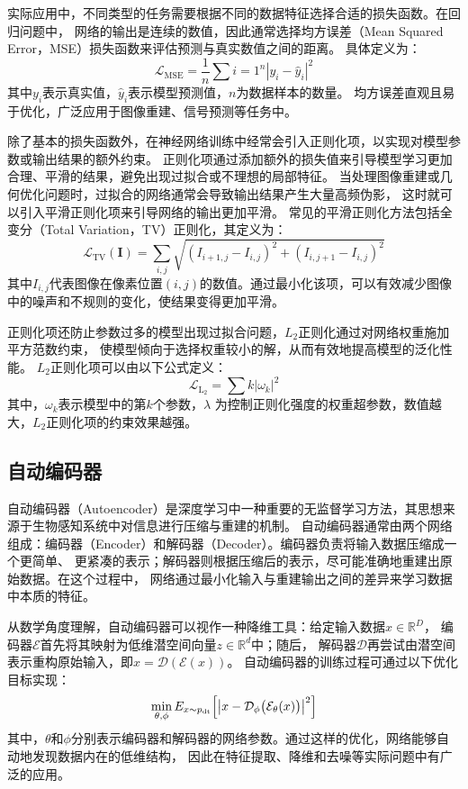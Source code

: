 实际应用中，不同类型的任务需要根据不同的数据特征选择合适的损失函数。在回归问题中，
网络的输出是连续的数值，因此通常选择均方误差（Mean Squared Error，MSE）损失函数来评估预测与真实数值之间的距离。
具体定义为：
\begin{equation} 
  \mathcal{L}_{\text{MSE}}=\frac{1}{n}\sum{i=1}^{n}\left|y_i - \hat{y}_i\right|^2 
\end{equation}
其中$y_i$表示真实值，$\hat{y}_i$表示模型预测值，$n$为数据样本的数量。
均方误差直观且易于优化，广泛应用于图像重建、信号预测等任务中。

除了基本的损失函数外，在神经网络训练中经常会引入正则化项，以实现对模型参数或输出结果的额外约束。
正则化项通过添加额外的损失值来引导模型学习更加合理、平滑的结果，避免出现过拟合或不理想的局部特征。
当处理图像重建或几何优化问题时，过拟合的网络通常会导致输出结果产生大量高频伪影，
这时就可以引入平滑正则化项来引导网络的输出更加平滑。
常见的平滑正则化方法包括全变分（Total Variation，TV）正则化，其定义为：
\begin{equation} 
  \mathcal{L}_{\text{TV}}(\boldsymbol{I})=\sum_{i,j}\sqrt{\left(I_{i+1,j}-I_{i,j}\right)^2+\left(I_{i,j+1}-I_{i,j}\right)^2} 
\end{equation} 
其中$I_{i,j}$代表图像在像素位置$(i,j)$的数值。通过最小化该项，可以有效减少图像中的噪声和不规则的变化，使结果变得更加平滑。

正则化项还防止参数过多的模型出现过拟合问题，$L_2$正则化通过对网络权重施加平方范数约束，
使模型倾向于选择权重较小的解，从而有效地提高模型的泛化性能。
$L_2$正则化项可以由以下公式定义：
\begin{equation}
  \mathcal{L}_{\mathrm{L_2}}=\sum{k}\left|\omega_k\right|^2 
\end{equation} 
其中，$\omega_k$表示模型中的第$k$个参数，$\lambda$ 为控制正则化强度的权重超参数，数值越大，$L_2$正则化项的约束效果越强。

\subsection{自动编码器} \label{sec:auto_encoder}
自动编码器（Autoencoder）是深度学习中一种重要的无监督学习方法，其思想来源于生物感知系统中对信息进行压缩与重建的机制。
自动编码器通常由两个网络组成：编码器（Encoder）和解码器（Decoder）。编码器负责将输入数据压缩成一个更简单、
更紧凑的表示；解码器则根据压缩后的表示，尽可能准确地重建出原始数据。在这个过程中，
网络通过最小化输入与重建输出之间的差异来学习数据中本质的特征。

从数学角度理解，自动编码器可以视作一种降维工具：给定输入数据$x\in\mathbb{R}^D$，
编码器$\mathcal{E}$首先将其映射为低维潜空间向量$z\in\mathbb{R}^d$中；随后，
解码器$\mathcal{D}$再尝试由潜空间表示重构原始输入，即$\hat{x}=\mathcal{D}\left(\mathcal{E}\left(x\right)\right)$。
自动编码器的训练过程可通过以下优化目标实现：
\begin{equation}\label{eq:ae_loss}
\min_{\theta,\phi}E_{x\sim p_{\mathrm{dt}}}\Bigl[\bigl|x-\mathcal{D}_\phi\bigl(\mathcal{E}_\theta(x)\bigr)\bigr|^2\Bigr]
\end{equation}
其中，$\theta$和$\phi$分别表示编码器和解码器的网络参数。通过这样的优化，网络能够自动地发现数据内在的低维结构，
因此在特征提取、降维和去噪等实际问题中有广泛的应用。

